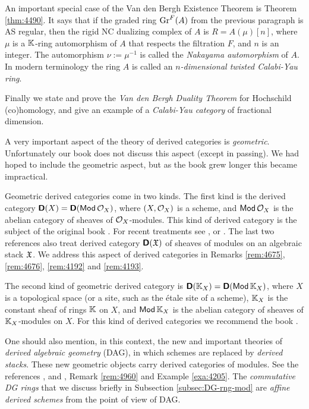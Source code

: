 An important special case of the Van den Bergh Existence Theorem is  
Theorem \ref{thm:4490}. It says that if the graded ring  $\operatorname{Gr}^F(A)$ from 
the previous paragraph is AS regular, then the rigid NC dualizing complex of 
$A$ is $R = A(\mu)[n]$,
where $\mu$ is a $\mathbb{K}$-ring automorphism of $A$ that respects the filtration 
$F$, and $n$ is an integer. The automorphism $\nu := \mu^{-1}$ is called the 
{\em Nakayama automorphism} of $A$. In modern terminology the ring $A$ is 
called an {\em $n$-dimensional twisted Calabi-Yau ring}. 

Finally we state and prove the {\em Van den Bergh Duality Theorem} for 
Hoch\-schild (co)homology, and give an example of a {\em Calabi-Yau category} 
of fractional dimension. 



A very important aspect of the theory of derived categories is {\em geometric}. 
Unfortunately our book does not discuss this aspect (except in passing).
We had hoped to include the geometric aspect, but as the 
book grew longer this became impractical. 

Geometric derived categories come in two kinds. The first kind is the derived 
category $\boldsymbol{\mathsf{D}}(X) = \boldsymbol{\mathsf{D}}(\operatorname{\mathsf{Mod}} \mathcal{O}_X)$, 
where $(X, \mathcal{O}_X)$ is a scheme, and $\operatorname{\mathsf{Mod}} \mathcal{O}_X$ is the abelian category 
of sheaves of $\mathcal{O}_X$-modules. This kind of derived category is the subject of 
the original book \cite{RD}. For recent treatments see \cite{Huy}, 
\cite{SP} or \cite{Ols}. The last two references also treat derived 
category $\boldsymbol{\mathsf{D}}(\mathfrak{X})$ of sheaves of modules on an algebraic stack 
$\mathfrak{X}$. We address this aspect of derived categories in Remarks 
\ref{rem:4675}, \ref{rem:4676}, \ref{rem:4192} and \ref{rem:4193}. 

The second kind of geometric derived category is 
$\boldsymbol{\mathsf{D}}(\mathbb{K}_X) = \boldsymbol{\mathsf{D}}(\operatorname{\mathsf{Mod}} \mathbb{K}_X)$, where $X$ is a topological space
(or a site, such as the \'etale site of a scheme), $\mathbb{K}_X$ is the constant 
sheaf of rings $\mathbb{K}$ on $X$, and 
$\operatorname{\mathsf{Mod}} \mathbb{K}_X$ is the abelian category of sheaves of $\mathbb{K}_X$-modules on $X$.
For this kind of derived categories we recommend the book \cite{KaSc1}. 

One should also mention, in this context, the new and important theories of 
{\em derived algebraic geometry} (DAG), in which schemes are replaced by
{\em derived stacks}. These new geometric objects carry derived categories of 
modules. See the references \cite{Lur}, \cite{To2} and \cite{nLab}, 
Remark \ref{rem:4960} and Example \ref{exa:4205}.
The {\em commutative DG rings} that we discuss briefly in Subsection 
\ref{subsec:DG-rng-mod} are {\em affine derived schemes} from the point of view 
of DAG. 
 

